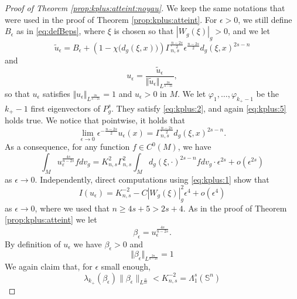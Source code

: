 \documentclass[10pt]{amsart}
\numberwithin{equation}{section}
\def\be{{\beta}}
\def\ep{{\varepsilon}}
\newcommand{\ve}{\varepsilon}
\newcommand{\vp}{\varphi}
\def \ep{\epsilon}
\theoremstyle{plain}
\theoremstyle{remark}
\begin{document}
\begin{proof}[Proof of Theorem \ref{prop:kplus:atteint:noyau}]
We keep the same notations that were used in the proof of Theorem \ref{prop:kplus:atteint}. For $\ep >0$, we still define $B_\ep$ as in \eqref{eq:defBeps}, where $\xi$ is chosen so that $|W_g(\xi)|_g >0$, and we let 
$$\tilde{u}_\ep = B_\ep +  \left(1-\chi\big( d_g(\xi, x) \big)\right)\Gamma_{n,s}^{\frac{n-2s}{2}} \ep^{\frac{n-2s}{2}} d_g(\xi, x)^{2s-n}$$ 
and 
$$u_\ep = \frac{\tilde{u}_\ep}{\Vert \tilde{u}_\ep \Vert_{L^\frac{2n}{n-2s}}},$$
so that $u_\ep$ satisfies $\Vert u_\ep \Vert_{L^\frac{2n}{n-2s}} = 1$ and $u_\ep >0$ in $M$. We let $\vp_1, \dots, \vp_{k_+-1}$ be the $k_+-1$ first eigenvectors of $P_g^s$. They satisfy 
\eqref{eq:kplus:2}, and again \eqref{eq:kplus:5} holds true. We notice that pointwise, it holds that 
$$\lim_{\ep \to 0} \ep^{-\frac{n-2s}{2}}u_\ep(x) = \Gamma_{n,s}^{\frac{n-2s}{2}}  d_g(\xi, x)^{2s-n}.$$
As a consequence, for any function $f \in C^0(M)$, we have 
\begin{equation} \label{eq:kplus:5:1}
\int_{M} u_\ve^{\frac{4s}{n-2s}} f dv_g  = K_{n,s}^{2}\Gamma_{n,s}^2 \int_{M} d_g(\xi, \cdot)^{2s-n} f dv_g \cdot \ep^{2s} + o(\ep^{2s}) 
\end{equation}
as $\ep \to 0$. Independently, direct computations using \eqref{eq:kplus:1} show that 
\begin{equation} \label{eq:kplus:100}
I(u_\ep) =K_{n,s}^{-2} - C |W_g(\xi)|_g^2 \ep^4  + o(\ep^4) 
\end{equation}
as $\ep \to 0$, where we used that $n \ge 4s+5 > 2s+4$. As in the proof of Theorem \ref{prop:kplus:atteint} we let 
\begin{equation*}
\beta_\ep = u_{\ep}^{\frac{4s}{n-2s}}.
\end{equation*}
 By definition of $u_\ep$ we have $\be_\ep >0$ and 
 \begin{equation} \label{norm_beta_ep2}
     \Vert \beta_\ep \Vert_{L^{\frac{2n}{n-2s}}} = 1
 \end{equation}
 We again claim that, for $\ep$ small enough,
\begin{equation} \label{eq:kplus:6:noyau}
\lambda_{k_+}(\beta_\ep) \| \be_\ep\|_{L^{\frac{n}{2s}}} <  K_{n,s}^{-2} = \Lambda_1^s(\mathbb{S}^n)

\end{equation}
\end{proof}
\end{document}
